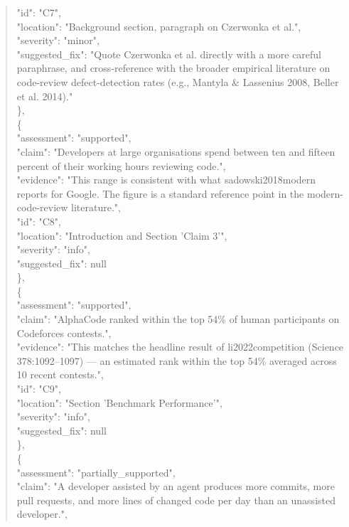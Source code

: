 \documentclass[11pt]{article}
\begin{document}
\begin{quote}
      "id": "C7",\\
      "location": "Background section, paragraph on Czerwonka et al.",\\
      "severity": "minor",\\
      "suggested\_fix": "Quote Czerwonka et al. directly with a more careful paraphrase, and cross-reference with the broader empirical literature on code-review defect-detection rates (e.g., Mantyla \& Lassenius 2008, Beller et al. 2014)."\\
    \},\\
    \{\\
      "assessment": "supported",\\
      "claim": "Developers at large organisations spend between ten and fifteen percent of their working hours reviewing code.",\\
      "evidence": "This range is consistent with what sadowski2018modern reports for Google. The figure is a standard reference point in the modern-code-review literature.",\\
      "id": "C8",\\
      "location": "Introduction and Section 'Claim 3'",\\
      "severity": "info",\\
      "suggested\_fix": null\\
    \},\\
    \{\\
      "assessment": "supported",\\
      "claim": "AlphaCode ranked within the top 54\% of human participants on Codeforces contests.",\\
      "evidence": "This matches the headline result of li2022competition (Science 378:1092--1097) --- an estimated rank within the top 54\% averaged across 10 recent contests.",\\
      "id": "C9",\\
      "location": "Section 'Benchmark Performance'",\\
      "severity": "info",\\
      "suggested\_fix": null\\
    \},\\
    \{\\
      "assessment": "partially\_supported",\\
      "claim": "A developer assisted by an agent produces more commits, more pull requests, and more lines of changed code per day than an unassisted developer.",\\

\end{quote}
\end{document}

